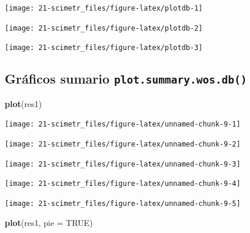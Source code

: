 \documentclass[]{book}
\newenvironment{Shaded}{\begin{snugshade}}{\end{snugshade}}
\newcommand{\KeywordTok}[1]{\textcolor[rgb]{0.13,0.29,0.53}{\textbf{#1}}}
\newcommand{\DataTypeTok}[1]{\textcolor[rgb]{0.13,0.29,0.53}{#1}}
\newcommand{\OtherTok}[1]{\textcolor[rgb]{0.56,0.35,0.01}{#1}}
\newcommand{\NormalTok}[1]{#1}
\begin{document}
\begin{center}\texttt{[image: 21-scimetr\_files/figure-latex/plotdb-1]} \end{center}

\begin{center}\texttt{[image: 21-scimetr\_files/figure-latex/plotdb-2]} \end{center}

\begin{center}\texttt{[image: 21-scimetr\_files/figure-latex/plotdb-3]} \end{center}

\subsection{\texorpdfstring{Gráficos sumario
\texttt{plot.summary.wos.db()}}{Gráficos sumario plot.summary.wos.db()}}\label{graficos-sumario-plot.summary.wos.db}

\begin{Shaded}
\begin{Highlighting}[]
\KeywordTok{plot}\NormalTok{(res1)}
\end{Highlighting}
\end{Shaded}

\begin{flushleft}\texttt{[image: 21-scimetr\_files/figure-latex/unnamed-chunk-9-1]} \end{flushleft}

\begin{flushleft}\texttt{[image: 21-scimetr\_files/figure-latex/unnamed-chunk-9-2]} \end{flushleft}

\begin{flushleft}\texttt{[image: 21-scimetr\_files/figure-latex/unnamed-chunk-9-3]} \end{flushleft}

\begin{flushleft}\texttt{[image: 21-scimetr\_files/figure-latex/unnamed-chunk-9-4]} \end{flushleft}

\begin{flushleft}\texttt{[image: 21-scimetr\_files/figure-latex/unnamed-chunk-9-5]} \end{flushleft}

\begin{Shaded}
\begin{Highlighting}[]
\KeywordTok{plot}\NormalTok{(res1, }\DataTypeTok{pie =} \OtherTok{TRUE}\NormalTok{)}
\end{Highlighting}
\end{Shaded}
\end{document}
